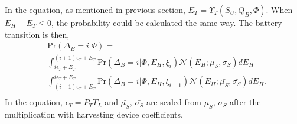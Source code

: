 \documentclass[conference]{IEEEtran}
\begin{document}
In the equation, as mentioned in previous section, \(E_T = \Upsilon_T(S_U, Q_B, \Phi)\).
When \(E_H - E_T \le 0\), the probability could be calculated the same way.
The battery transition is then,
\begin{equation}\label{battery}
\begin{aligned}
	&\mbox{Pr}\left(\Delta_B = i |\Phi\right) = \\
	&\int\nolimits_{i\epsilon_T + E_T}^{\left(i+1\right)\epsilon_T+ E_T}
	\mbox{Pr}\left(\Delta_B = i |\Phi, E_H, \xi_i\right) \mathcal{N}\left(E_H;\bar{\mu_S},\bar{\sigma_S}\right) dE_H+\\
	& \int_{\left(i-1\right)\epsilon_T+ E_T}^{i\epsilon_T + E_T}
	\mbox{Pr}\left(\Delta_B = i |\Phi, E_H, \xi_{i-1}\right) \mathcal{N}\left(E_H;\bar{\mu_S},\bar{\sigma_S}\right) dE_H.\\
\end{aligned}
\end{equation}
In the equation, \(\epsilon_T = P_TT_L\) and \(\bar{\mu_S},\,\bar{\sigma_S}\)
are scaled from \(\mu_S,\,\sigma_S\) after the multiplication with harvesting device coefficients.
\end{document}
